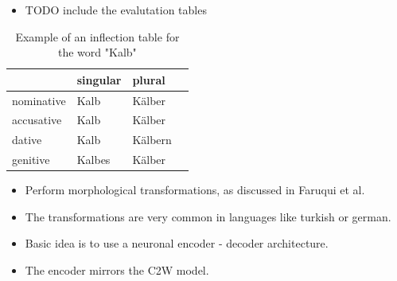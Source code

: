 \documentclass[11pt, a4paper, landscape]{article}
\begin{document}
\NewPage{}

\vfill
\begin{itemize}
\item TODO include the evalutation tables
\end{itemize}
\vfill




\NewPage{}

\vfill
\begin{table}
\begin{center}
\begin{tabular}{ l l l l }
  \hline
             & singular & plural \\ \hline
  nominative & Kalb & K\"alber \\
  accusative & Kalb & K\"alber \\
  dative & Kalb & K\"albern \\
  genitive & Kalbes & K\"alber \\
\end{tabular}
\end{center}
\caption{Example of an inflection table for the word "Kalb" }
\end{table}
\vfill
\begin{itemize}
\item Perform morphological transformations, as discussed in Faruqui et al. \cite{DBLP:journals/corr/FaruquiTND15}
\item The transformations are very common in languages like turkish or german.
\item Basic idea is to use a neuronal encoder - decoder architecture.
\item The encoder mirrors the C2W model.
\end{itemize}
\vfill

\NewPage{}
\end{document}
